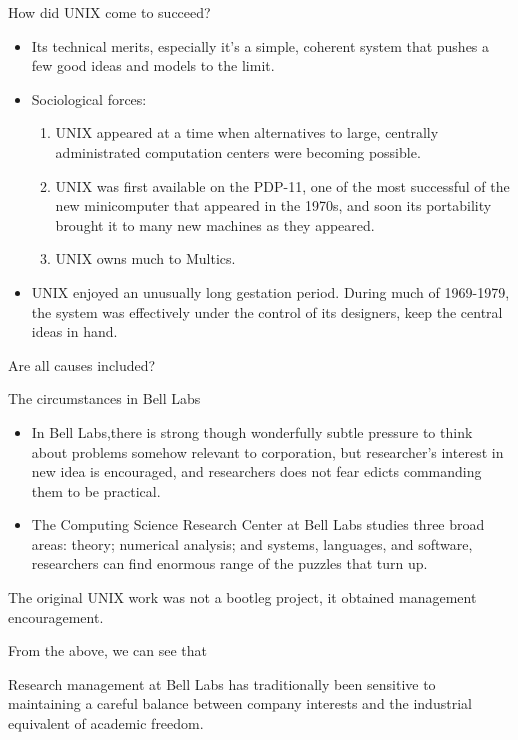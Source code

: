 \documentclass[CJK]{beamer}
\begin{document}
\begin{CJK*}{UTF8}{gbsn}
\begin{frame}{How did UNIX come to succeed?}
	\begin{itemize}
		\item Its technical merits, especially it's a simple, coherent system that pushes a few good ideas and models to the limit.
		\item Sociological forces:
			\begin{enumerate}
				\item UNIX appeared at a time when alternatives to large, centrally administrated computation centers were becoming possible.
				\item UNIX was first available on the PDP-11, one of the most successful of the new minicomputer that appeared in the 1970s, and soon its portability brought it to many new machines as they appeared.
				\item UNIX owns much to Multics.
			\end{enumerate}
		\item UNIX enjoyed an unusually long gestation period. During much of 1969-1979, the system was effectively under the control of its designers, keep the central ideas in hand.
	\end{itemize}
\begin{block}{}
\begin{center}
Are all causes included? 
\end{center}
\end{block}
\end{frame}

{\small
\begin{frame}{The circumstances in Bell Labs}
	\begin{itemize}
		\item In Bell Labs,there is strong though wonderfully subtle pressure to think about problems somehow relevant to corporation, but researcher's interest in new idea is encouraged, and researchers does not fear edicts commanding them to be practical.
		\item The Computing Science Research Center at Bell Labs studies three broad areas: theory; numerical analysis; and systems, languages, and software, researchers can find enormous range of the puzzles that turn up.
	\end{itemize}
\begin{block}{}
The original UNIX work was not a bootleg project, it obtained management encouragement.
\end{block}
From the above, we can see that
\begin{block}{}
 Research management at Bell Labs has traditionally been sensitive to maintaining a careful balance between company interests and the industrial equivalent of academic freedom.
\end{block}
\end{frame}
}


\end{CJK*}
\end{document}
